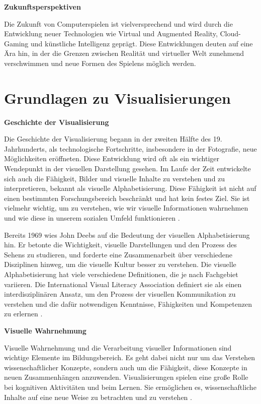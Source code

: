 \textbf{Zukunftsperspektiven}

Die Zukunft von Computerspielen ist vielversprechend und wird durch die Entwicklung neuer Technologien wie Virtual und Augmented Reality, Cloud-Gaming und künstliche Intelligenz geprägt. Diese Entwicklungen deuten auf eine Ära hin, in der die Grenzen zwischen Realität und virtueller Welt zunehmend verschwimmen und neue Formen des Spielens möglich werden.

\section{Grundlagen zu Visualisierungen}

\textbf{Geschichte der Visualisierung}

Die Geschichte der Visualisierung begann in der zweiten Hälfte des 19. Jahrhunderts, als technologische Fortschritte, insbesondere in der Fotografie, neue Möglichkeiten eröffneten. Diese Entwicklung wird oft als ein wichtiger Wendepunkt in der visuellen Darstellung gesehen. Im Laufe der Zeit entwickelte sich auch die Fähigkeit, Bilder und visuelle Inhalte zu verstehen und zu interpretieren, bekannt als visuelle Alphabetisierung. Diese Fähigkeit ist nicht auf einen bestimmten Forschungsbereich beschränkt und hat kein festes Ziel. Sie ist vielmehr wichtig, um zu verstehen, wie wir visuelle Informationen wahrnehmen und wie diese in unserem sozialen Umfeld funktionieren \cite{Simunek2009}.

Bereits 1969 wies John Deebs auf die Bedeutung der visuellen Alphabetisierung hin. Er betonte die Wichtigkeit, visuelle Darstellungen und den Prozess des Sehens zu studieren, und forderte eine Zusammenarbeit über verschiedene Disziplinen hinweg, um die visuelle Kultur besser zu verstehen. Die visuelle Alphabetisierung hat viele verschiedene Definitionen, die je nach Fachgebiet variieren. Die International Visual Literacy Association definiert sie als einen interdisziplinären Ansatz, um den Prozess der visuellen Kommunikation zu verstehen und die dafür notwendigen Kenntnisse, Fähigkeiten und Kompetenzen zu erlernen \cite{Wiebe2001}.

\textbf{Visuelle Wahrnehmung}

Visuelle Wahrnehmung und die Verarbeitung visueller Informationen sind wichtige Elemente im Bildungsbereich. Es geht dabei nicht nur um das Verstehen wissenschaftlicher Konzepte, sondern auch um die Fähigkeit, diese Konzepte in neuen Zusammenhängen anzuwenden. Visualisierungen spielen eine große Rolle bei kognitiven Aktivitäten und beim Lernen. Sie ermöglichen es, wissenschaftliche Inhalte auf eine neue Weise zu betrachten und zu verstehen \cite{Wiebe2001}.

